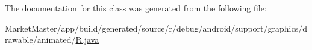 The documentation for this class was generated from the following file\+:\begin{DoxyCompactItemize}
\item 
Market\+Master/app/build/generated/source/r/debug/android/support/graphics/drawable/animated/\mbox{\hyperlink{debug_2android_2support_2graphics_2drawable_2animated_2R_8java}{R.\+java}}\end{DoxyCompactItemize}
